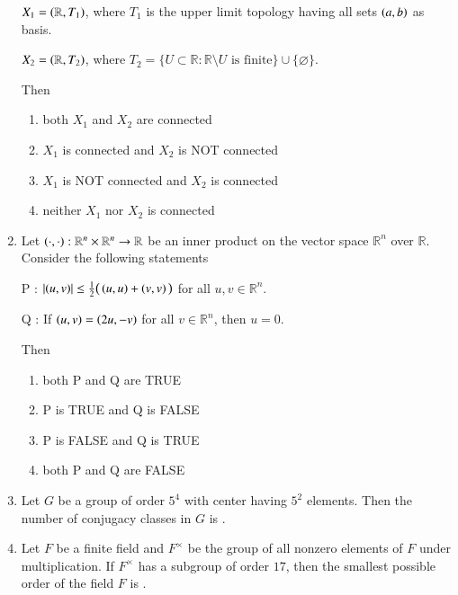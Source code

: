 \documentclass[journal,12pt,onecolumn]{IEEEtran}
\theoremstyle{remark}
\begin{document}
\begin{enumerate}[start=1, label=Q.\arabic*]
$X_{1}=\left(\mathbb{R},T_{1}\right)$, where $T_{1}$ is the upper limit topology having all sets $\left(a,b\right)$ as basis.  

$X_{2}=\left(\mathbb{R},T_{2}\right)$, where $T_{2}=\{U \subset \mathbb{R} : \mathbb{R}\setminus U \text{ is finite}\}\cup \{\varnothing\}$.  

Then
\begin{enumerate}
\item both $X_{1}$ and $X_{2}$ are connected
\item $X_{1}$ is connected and $X_{2}$ is NOT connected
\item $X_{1}$ is NOT connected and $X_{2}$ is connected
\item neither $X_{1}$ nor $X_{2}$ is connected
\end{enumerate}

\hfill{}
\item Let $\left(\cdot,\cdot\right): \mathbb{R}^{n}\times \mathbb{R}^{n}\to \mathbb{R}$ be an inner product on the vector space $\mathbb{R}^{n}$ over $\mathbb{R}$.  
Consider the following statements\brak{:}

P : $\left\vert\left(u,v\right)\right\vert \leq \tfrac{1}{2}\big(\left(u,u\right)+\left(v,v\right)\big)$ for all $u,v\in \mathbb{R}^{n}$.  

Q : If $\left(u,v\right)=\left(2u,-v\right)$ for all $v\in \mathbb{R}^{n}$, then $u=0$.  

Then
\begin{enumerate}
\item both P and Q are TRUE
\item P is TRUE and Q is FALSE
\item P is FALSE and Q is TRUE
\item both P and Q are FALSE
\end{enumerate}

\hfill{}
\item Let $G$ be a group of order $5^{4}$ with center having $5^{2}$ elements.  
Then the number of conjugacy classes in $G$ is \underline{\hspace{2cm}}.  

\hfill{}


\item Let $F$ be a finite field and $F^{\times}$ be the group of all nonzero elements of $F$ under multiplication.  
If $F^{\times}$ has a subgroup of order $17$, then the smallest possible order of the field $F$ is \underline{\hspace{2cm}}.  


\end{enumerate}
\end{document}
